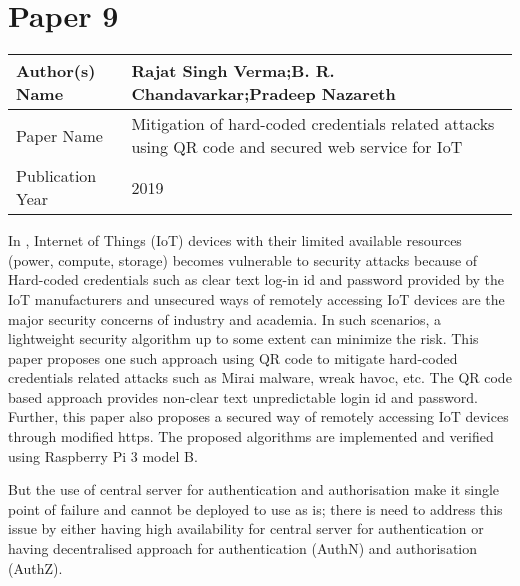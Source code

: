 \section{Paper 9}
    \begin{center}
    \begin{tabular}{ | m{5em} | m{25em} |} 
      \hline
      Author(s) Name &  Rajat Singh Verma;B. R. Chandavarkar;Pradeep Nazareth\\ 
      \hline
      Paper Name &  Mitigation of hard-coded credentials related attacks using QR code and secured web service for IoT\\ 
      \hline
      Publication Year &  2019 \\ 
      \hline
    \end{tabular}
    \end{center}
    In \cite{8944592}, Internet of Things (IoT) devices with their limited available resources (power, compute, storage) becomes vulnerable to security attacks because of Hard-coded credentials such as clear text log-in id and password provided by the IoT manufacturers and unsecured ways of remotely accessing IoT devices are the major security concerns of industry and academia. In such scenarios, a lightweight security algorithm up to some extent can minimize the risk. This paper proposes one such approach using \ac{QR} code to mitigate hard-coded credentials related attacks such as Mirai malware, wreak havoc, etc. The QR code based approach provides non-clear text unpredictable login id and password. Further, this paper also proposes a secured way of remotely accessing IoT devices through modified https. The proposed algorithms are implemented and verified using Raspberry Pi 3 model B. 
    \par But the use of central server for authentication and authorisation make it single point of failure and cannot be deployed to use as is; there is need to address this issue by either having high availability for central server for authentication or having decentralised approach for authentication (AuthN) and authorisation (AuthZ).